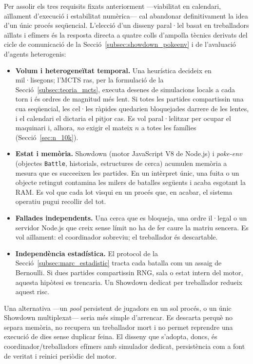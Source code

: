 Per assolir els tres requisits fixats anteriorment ---viabilitat en calendari, aïllament d'execució i estabilitat numèrica--- cal abandonar definitivament la idea d'un únic procés seqüencial. L'elecció d'un disseny paral·lel basat en treballadors aïllats i efímers és la resposta directa a quatre colls d'ampolla tècnics derivats del cicle de comunicació de la Secció~\ref{subsec:showdown_pokeenv} i de l'avaluació d'agents heterogenis:

\begin{itemize}
    \item \textbf{Volum i heterogeneïtat temporal.} Una heurística decideix en mil·lisegons; l'MCTS ras, per la formulació de la Secció~\ref{subsec:teoria_mcts}, executa desenes de simulacions locals a cada torn i és ordres de magnitud més lent. Si totes les partides compartissin una cua seqüencial, les cel·les ràpides quedarien bloquejades darrere de les lentes, i el calendari el dictaria el pitjor cas. Es vol paral·lelitzar per ocupar el maquinari i, alhora, \emph{no} exigir el mateix $n$ a totes les famílies (Secció~\ref{sec:n_10k}).
    \item \textbf{Estat i memòria.} Showdown (motor JavaScript V8 de Node.js) i \textit{poke-env} (objectes \texttt{Battle}, historials, estructures de cerca) acumulen memòria a mesura que es succeeixen les partides. En un intèrpret únic, una fuita o un objecte retingut contamina les milers de batalles següents i acaba esgotant la RAM. Es vol que cada lot visqui en un procés que, en acabar, el sistema operatiu pugui recollir del tot.
    \item \textbf{Fallades independents.} Una cerca que es bloqueja, una ordre il·legal o un servidor Node.js que creix sense límit no ha de fer caure la matriu sencera. Es vol aïllament: el coordinador sobreviu; el treballador és descartable.
    \item \textbf{Independència estadística.} El protocol de la Secció~\ref{subsec:marc_estadistic} tracta cada batalla com un assaig de Bernoulli. Si dues partides compartissin RNG, sala o estat intern del motor, aquesta hipòtesi es trencaria. Un Showdown dedicat per treballador redueix aquest risc.
\end{itemize}

Una alternativa ---un \emph{pool} persistent de jugadors en un sol procés, o un únic Showdown multiplexat--- seria més simple d'arrencar. Es descarta perquè no separa memòria, no recupera un treballador mort i no permet reprendre una execució de dies sense duplicar feina. El disseny que s'adopta, doncs, és coordinador/treballadors efímers amb simulador dedicat, persistència com a font de veritat i reinici periòdic del motor.


